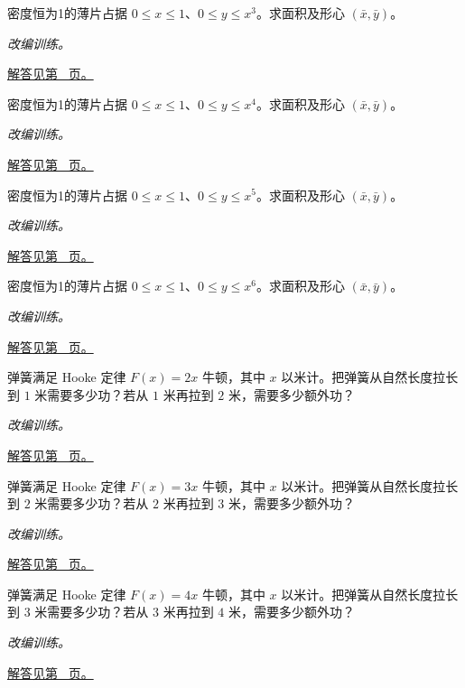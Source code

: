 \documentclass[12pt,fontset=fandol]{ctexart}
\begin{document}
\begin{example}[曲边梯形的形心]\label{ex:c21q15}
密度恒为1的薄片占据 $0\le x\le1$、$0\le y\le x^{3}$。求面积及形心 $(\bar x,\bar y)$。
\par\textit{改编训练。}\par\hyperref[ans:c21q15]{解答见第~\pageref{ans:c21q15} 页。}
\end{example}
\begin{example}[曲边梯形的形心]\label{ex:c21q16}
密度恒为1的薄片占据 $0\le x\le1$、$0\le y\le x^{4}$。求面积及形心 $(\bar x,\bar y)$。
\par\textit{改编训练。}\par\hyperref[ans:c21q16]{解答见第~\pageref{ans:c21q16} 页。}
\end{example}
\begin{example}[曲边梯形的形心]\label{ex:c21q17}
密度恒为1的薄片占据 $0\le x\le1$、$0\le y\le x^{5}$。求面积及形心 $(\bar x,\bar y)$。
\par\textit{改编训练。}\par\hyperref[ans:c21q17]{解答见第~\pageref{ans:c21q17} 页。}
\end{example}
\begin{example}[曲边梯形的形心]\label{ex:c21q18}
密度恒为1的薄片占据 $0\le x\le1$、$0\le y\le x^{6}$。求面积及形心 $(\bar x,\bar y)$。
\par\textit{改编训练。}\par\hyperref[ans:c21q18]{解答见第~\pageref{ans:c21q18} 页。}
\end{example}
\begin{example}[变力做功]\label{ex:c21q19}
弹簧满足 Hooke 定律 $F(x)=2x$ 牛顿，其中 $x$ 以米计。把弹簧从自然长度拉长到 $1$ 米需要多少功？若从 $1$ 米再拉到 $2$ 米，需要多少额外功？
\par\textit{改编训练。}\par\hyperref[ans:c21q19]{解答见第~\pageref{ans:c21q19} 页。}
\end{example}
\begin{example}[变力做功]\label{ex:c21q20}
弹簧满足 Hooke 定律 $F(x)=3x$ 牛顿，其中 $x$ 以米计。把弹簧从自然长度拉长到 $2$ 米需要多少功？若从 $2$ 米再拉到 $3$ 米，需要多少额外功？
\par\textit{改编训练。}\par\hyperref[ans:c21q20]{解答见第~\pageref{ans:c21q20} 页。}
\end{example}
\begin{example}[变力做功]\label{ex:c21q21}
弹簧满足 Hooke 定律 $F(x)=4x$ 牛顿，其中 $x$ 以米计。把弹簧从自然长度拉长到 $3$ 米需要多少功？若从 $3$ 米再拉到 $4$ 米，需要多少额外功？
\par\textit{改编训练。}\par\hyperref[ans:c21q21]{解答见第~\pageref{ans:c21q21} 页。}
\end{example}
\end{document}
